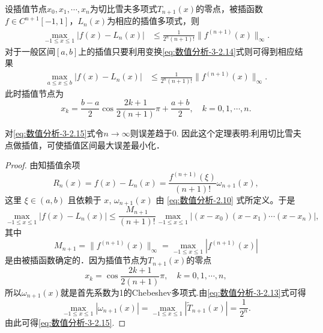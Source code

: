 \documentclass[../../main.tex]{subfiles}
\begin{document}
\begin{theorem}
设插值节点$x_0,x_1,\cdots,x_n$为切比雪夫多项式$T_{n+1}(x)$的零点，被插函数$f \in C^{n+1}[-1,1]$，$L_n(x)$为相应的插值多项式，则
\begin{align}\label{eq:数值分析-3-2.15}
\max_{-1 \leqslant x \leqslant 1} |f(x) - L_n(x)| &\leqslant \frac{1}{2^n (n+1)!}\|f^{(n+1)}(x)\|_\infty.
\end{align}
对于一般区间$[a,b]$上的插值只要利用变换\eqref{eq:数值分析-3-2.14}式则可得到相应结果
\begin{align*}
\max_{a \leqslant x \leqslant b} |f(x) - L_n(x)| &\leqslant \frac{1}{2^n (n+1)!}\|f^{(n+1)}(x)\|_\infty.
\end{align*}
此时插值节点为
$$x_k = \frac{b - a}{2}\cos\frac{2k+1}{2(n+1)}\pi + \frac{a + b}{2},\quad k = 0,1,\cdots,n.$$
\end{theorem}
\begin{note}
对\eqref{eq:数值分析-3-2.15}式令$n\to \infty$则误差趋于0. 因此这个定理表明:利用切比雪夫点做插值，可使插值区间最大误差最小化．
\end{note}
\begin{proof}
由知插值余项
$$R_n(x) = f(x) - L_n(x) = \frac{f^{(n+1)}(\xi)}{(n+1)!}\omega_{n+1}(x),$$
这里 $\xi \in (a, b)$ 且依赖于 $x$,$\,\,\omega_{n + 1}(x)$ 由 \eqref{eq:数值分析-2.10} 式所定义。于是
$$\max_{-1 \leqslant x \leqslant 1} |f(x) - L_n(x)| \leqslant \frac{M_{n+1}}{(n+1)!}\max_{-1 \leqslant x \leqslant 1} |(x - x_0)(x - x_1)\cdots(x - x_n)|,$$
其中
$$M_{n+1} = \|f^{(n+1)}(x)\|_\infty = \max_{-1 \leqslant x \leqslant 1} |f^{(n+1)}(x)|$$
是由被插函数确定的．因为插值节点为$T_{n+1}(x)$的零点
$$x_k = \cos\frac{2k+1}{2(n+1)}\pi,\quad k = 0,1,\cdots,n,$$
所以$\omega_{n+1}(x)$就是首先系数为1的Chebeshev多项式.由\eqref{eq:数值分析-3-2.13}式可得
$$\max_{-1 \leqslant x \leqslant 1} |\omega_{n+1}(x)| = \max_{-1 \leqslant x \leqslant 1} |\widetilde{T}_{n+1}(x)| = \frac{1}{2^n}.$$
由此可得\eqref{eq:数值分析-3-2.15}.

\end{proof}
\end{document}
